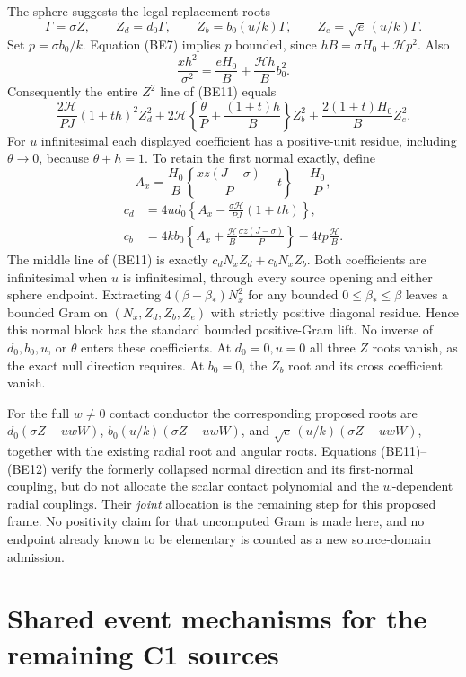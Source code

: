 The sphere suggests the legal replacement roots
\[
 \Gamma=\sigma Z,\qquad Z_d=d_0\Gamma,\qquad
 Z_b=b_0(u/k)\Gamma,\qquad Z_e=\sqrt e\,(u/k)\Gamma.
\]
Set $p=\sigma b_0/k$. Equation (BE7) implies $p$ bounded, since
$hB=\sigma H_0+\mathcal H p^2$. Also
\[
 \frac{xh^2}{\sigma^2}
   =\frac{eH_0}{B}+\frac{\mathcal Hh}{B}b_0^2.
\]
Consequently the entire $Z^2$ line of (BE11) equals
\[
 \frac{2\mathcal H}{PJ}(1+th)^2Z_d^2
 +2\mathcal H\left\{\frac\theta P+\frac{(1+t)h}{B}\right\}Z_b^2
 +\frac{2(1+t)H_0}{B}Z_e^2.                       \tag{BE12}
\]
For $u$ infinitesimal each displayed coefficient has a positive-unit
residue, including $\theta\to0$, because $\theta+h=1$.
To retain the first normal exactly, define
\[
 A_x=\frac{H_0}{B}\left\{\frac{xz(J-\sigma)}P-t\right\}
       -\frac{H_0}P,
\]
\begin{align*}
 c_d&=4ud_0\left\{A_x-\frac{\sigma\mathcal H}{PJ}(1+th)\right\},\\
 c_b&=4kb_0\left\{A_x+\frac{\mathcal H}{B}
                       \frac{\sigma z(J-\sigma)}P\right\}
                      -4tp\frac{\mathcal H}{B}.
\end{align*}
The middle line of (BE11) is exactly
$c_dN_xZ_d+c_bN_xZ_b$. Both coefficients are infinitesimal when
$u$ is infinitesimal, through every source opening and either sphere
endpoint. Extracting $4(\beta-\beta_*)N_x^2$ for any bounded
$0\le\beta_*\le\beta$ leaves a bounded Gram on
$(N_x,Z_d,Z_b,Z_e)$ with strictly positive diagonal residue. Hence
this normal block has the standard bounded positive-Gram lift.
No inverse of $d_0,b_0,u$, or $\theta$ enters these coefficients.
At $d_0=0,u=0$ all three $Z$ roots vanish, as the exact null direction
requires. At $b_0=0$, the $Z_b$ root and its cross coefficient vanish.

For the full $w\ne0$ contact conductor the corresponding proposed
roots are $d_0(\sigma Z-uwW)$,
$b_0(u/k)(\sigma Z-uwW)$, and
$\sqrt e\,(u/k)(\sigma Z-uwW)$, together with the existing radial
root and angular roots. Equations (BE11)--(BE12) verify the formerly
collapsed normal direction and its first-normal coupling, but do not
allocate the scalar contact polynomial and the $w$-dependent radial
couplings. Their \emph{joint} allocation is the remaining step for
this proposed frame. No positivity claim for that uncomputed Gram is
made here, and no endpoint already known to be elementary is counted
as a new source-domain admission.


\section{\texorpdfstring{Shared event mechanisms for the remaining C1 sources}{Shared event mechanisms for the remaining C1 sources}}
\label{component:p89fd3edb3edd}

